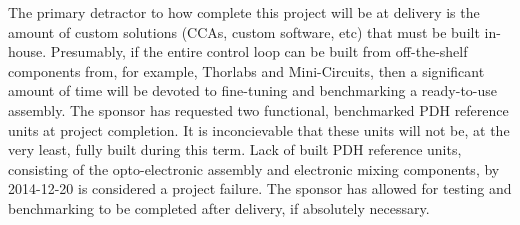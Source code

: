 The primary detractor to how complete this project will be at delivery
is the amount of custom solutions (CCAs, custom software, etc) that must be
built in-house. Presumably, if the entire control loop can be built from
off-the-shelf components from, for example, Thorlabs and Mini-Circuits,
then a significant amount of time will be devoted to fine-tuning and
benchmarking a ready-to-use assembly. The sponsor has requested two functional,
benchmarked PDH reference units at project completion. It is inconcievable that
these units will not be, at the very least, fully built during this term. Lack
of built PDH reference units, consisting of the opto-electronic assembly and
electronic mixing components, by 2014-12-20 is considered a project failure.
The sponsor has allowed for testing and benchmarking to be completed after
delivery, if absolutely necessary.